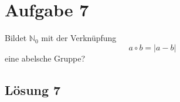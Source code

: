 \documentclass[main.tex]{subfiles}
\begin{document}
\section{Aufgabe 7}

Bildet $\mathbb{N}_0$ mit der Verknüpfung
\begin{equation*}
    a \circ b = \left| a-b \right|
\end{equation*}
eine abelsche Gruppe?

\subsection{Lösung 7}
\end{document}
